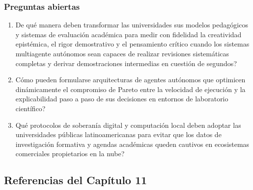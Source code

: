 \subsubsection*{Preguntas abiertas}
\begin{enumerate}[label=\arabic*., leftmargin=2em, itemsep=0.08cm, topsep=0.08cm, parsep=0pt]
    \item \textquestiondown De qué manera deben transformar las universidades sus modelos pedagógicos y sistemas de evaluación académica para medir con fidelidad la creatividad epistémica, el rigor demostrativo y el pensamiento crítico cuando los sistemas multiagente autónomos sean capaces de realizar revisiones sistemáticas completas y derivar demostraciones intermedias en cuestión de segundos?
    \item \textquestiondown Cómo pueden formularse arquitecturas de agentes autónomos que optimicen dinámicamente el compromiso de Pareto entre la velocidad de ejecución y la explicabilidad paso a paso de sus decisiones en entornos de laboratorio científico?
    \item \textquestiondown Qué protocolos de soberanía digital y computación local deben adoptar las universidades públicas latinoamericanas para evitar que los datos de investigación formativa y agendas académicas queden cautivos en ecosistemas comerciales propietarios en la nube?
\end{enumerate}

\newpage
{}
\subsection*{Referencias del Capítulo 11}

